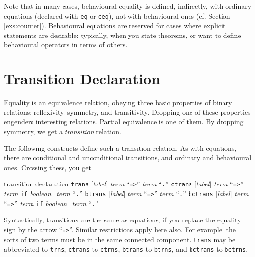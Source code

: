 \documentclass[a4paper]{memoir}
\begin{document}
Note that in many cases, behavioural equality is defined, indirectly,
with ordinary equations (declared with \verb|eq| or \verb|ceq|), not with
behavioural ones (cf. Section \ref{exs:counter}).
Behavioural equations are reserved for cases
where explicit statements are desirable: typically, when
you state theorems, or want to define behavioural operators in terms of
others.

\section{Transition Declaration}\label{sec:p2-trans-decl}

Equality is an equivalence relation, obeying three basic properties
of binary relations: reflexivity, symmetry, and transitivity.
Dropping one of these properties engenders interesting relations.
Partial equivalence is one of them. By dropping symmetry, we get
a {\em transition} relation.

The following constructs define such a transition relation.
As with equations, there are conditional and unconditional transitions,
and ordinary and behavioural ones. Crossing these, you get

\begin{bsyntax} transition declaration \Hline
{}
\texttt{trans} $[$\textit{label}$]$ \textit{term} ``\texttt{=>}'' \textit{term} ``\texttt{.}''
\texttt{ctrans} $[$\textit{label}$]$ \textit{term} ``\texttt{=>}'' \textit{term} \texttt{if} \textit{boolean\_term} ``\texttt{.}''
\texttt{btrans} $[$\textit{label}$]$ \textit{term} ``\texttt{=>}'' \textit{term} ``\texttt{.}''
\texttt{bctrans} $[$\textit{label}$]$ \textit{term} ``\texttt{=>}'' \textit{term} \texttt{if} \textit{boolean\_term} ``\texttt{.}''
\end{bsyntax}

Syntactically, transitions are the same as equations, if you
replace the equality sign by the arrow ``\verb|=>|''. Similar restrictions
apply here also. For example, the sorts of two terms must be in the same
connected component.
\verb|trans| may be abbreviated to \verb|trns|,
\verb|ctrans| to \verb|ctrns|, \verb|btrans| to \verb|btrns|, and
\verb|bctrans| to \verb|bctrns|.
\end{document}
